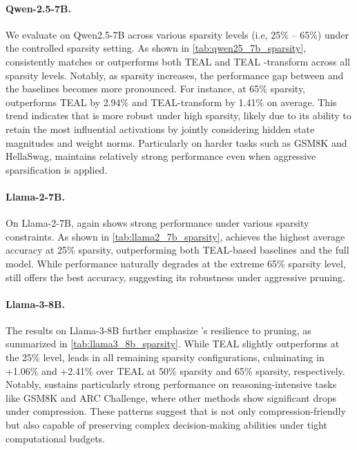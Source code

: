 {
\paragraph{Qwen-2.5-7B.} {We evaluate \algacro{} on Qwen2.5-7B \citep{yang2024qwen2} across various sparsity levels (i.e, 25\% -- 65\%) under the controlled sparsity setting. As shown in \autoref{tab:qwen25_7b_sparsity}, \algacro{} consistently matches or outperforms both TEAL and TEAL -transform across all sparsity levels. Notably, as sparsity increases, the performance gap between \algacro{} and the baselines becomes more pronounced. For instance, at 65\% sparsity, \algacro{} outperforms TEAL by 2.94\% and TEAL-transform by 1.41\% on average. This trend indicates that \algacro{} is more robust under high sparsity, likely due to its ability to retain the most influential activations by jointly considering hidden state magnitudes and weight norms. Particularly on harder tasks such as GSM8K and HellaSwag, \algacro{} maintains relatively strong performance even when aggressive sparsification is applied.}


\paragraph{Llama-2-7B.} {On Llama-2-7B, \algacro{} again shows strong performance under various sparsity constraints. As shown in \autoref{tab:llama2_7b_sparsity}, \algacro{} achieves the highest average accuracy at 25\% sparsity, outperforming both TEAL-based baselines and the full model. While performance naturally degrades at the extreme 65\% sparsity level, \algacro{} still offers the best accuracy, suggesting its robustness under aggressive pruning.}


\paragraph{Llama-3-8B.} The results on Llama-3-8B further emphasize \algacro{}’s resilience to pruning, as summarized in \autoref{tab:llama3_8b_sparsity}. While TEAL slightly outperforms at the 25\% level, \algacro{} leads in all remaining sparsity configurations, culminating in +1.06\% and +2.41\% over TEAL at 50\% sparsity and 65\% sparsity, respectively. Notably, \algacro{} sustains particularly strong performance on reasoning-intensive tasks like GSM8K and ARC Challenge, where other methods show significant drops under compression. These patterns suggest that \algacro{} is not only compression-friendly but also capable of preserving complex decision-making abilities under tight computational budgets.

}
